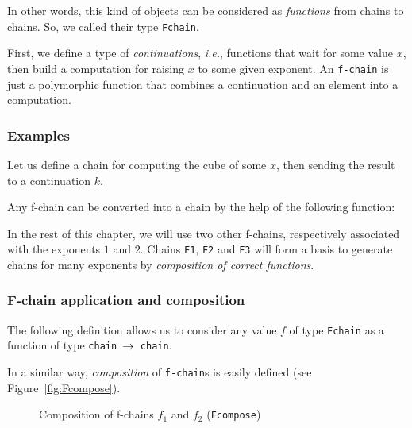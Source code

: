 In other words, this kind of objects can be considered as \emph{functions}
from chains to chains. So, we called their type \texttt{Fchain}.



First, we define a type of \emph{continuations},
\emph{i.e.},  functions  that wait for some value $x$, then 
build  a computation for raising {$x$} to some  given exponent.
An \texttt{f-chain} is just a polymorphic function that combines  a 
continuation and an element into a computation.


\subsubsection{Examples}

Let us define a chain for computing the cube of some $x$, then sending 
the result to a continuation $k$.


Any f-chain can be converted into a chain by the help of the following function:



In the rest of this chapter, we will use two other f-chains, respectively associated with the exponents $1$ and $2$. Chains \texttt{F1}, \texttt{F2} and
\texttt{F3} will form a basis to generate  chains for many exponents
by \emph{composition of correct functions}.



\subsubsection{F-chain application and composition}

The following definition allows us to consider any value {$f$} 
of type 
\texttt{Fchain} as a function of type \texttt{chain $\mbox{$\rightarrow$}$ chain}.



In a similar way, \emph{composition} of \texttt{f-chain}s is easily defined
(see Figure~\vref{fig:Fcompose}).





\begin{figure}[h]
  \centering
  \caption{Composition  of f-chains $f_1$ and $f_2$ (\texttt{Fcompose})}
  \label{fig:Fcompose}
\end{figure}
